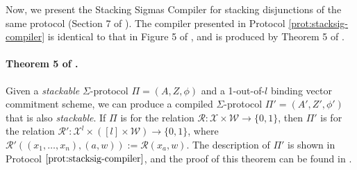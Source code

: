   Now, we present the Stacking Sigmas Compiler for stacking disjunctions of the same protocol (Section 7 of \cite{StackingSigmas}). The compiler 
  presented in Protocol \ref{prot:stacksig-compiler} is identical to that in Figure 5 of \cite{StackingSigmas}, and is produced by Theorem 5 of \cite{StackingSigmas}.

  \paragraph{Theorem 5 of \cite{StackingSigmas}.} Given a \textit{stackable} $\Sigma$-protocol $\Pi = (A, Z, \phi)$ and a 
  1-out-of-$l$ binding vector commitment scheme, we can produce a compiled $\Sigma$-protocol $\Pi' = (A', Z', \phi')$ that is also \textit{stackable}. If 
  $\Pi$ is for the relation $\mathcal R: \mathcal X \times \mathcal W \rightarrow \{0,1\}$, then $\Pi'$ is for the relation $\mathcal R': \mathcal X^l \times 
  ([l] \times \mathcal W) \rightarrow \{0,1\}$, where $\mathcal R'((x_1,\ldots, x_n), (a,w)) := \mathcal R(x_a, w)$.
  The 
  description of $\Pi'$ is shown in Protocol $\ref{prot:stacksig-compiler}$, and the proof of this theorem can be found in \cite{StackingSigmas}.

